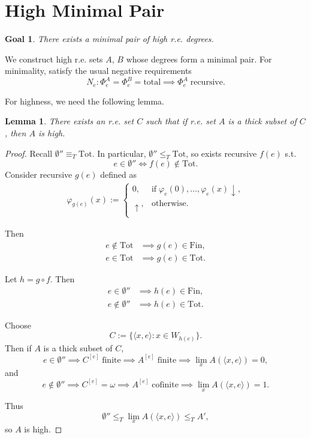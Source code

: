 \documentclass{article}
\newtheorem{lemma}{Lemma}[subsection]
\newtheorem{goal}{Goal}[subsection]
\begin{document}
\section{High Minimal Pair}
  \begin{goal}
    There exists a minimal pair of high r.e. degrees.
  \end{goal}

  We construct high r.e. sets $A$, $B$ whose degrees form a minimal pair.
  For minimality, satisfy the usual negative requirements
  \[N_e: \Phi_e^A=\Phi_e^B=\text{total} \implies \Phi_e^A\;
  \text{recursive}.\]

  For highness, we need the following lemma.
  \begin{lemma}
    There exists an r.e. set $C$ such that if r.e. set $A$ is a thick
    subset of $C$, then $A$ is high.
  \end{lemma}
  \begin{proof}
    Recall $\emptyset''\equiv_T\text{Tot}$. In
    particular, $\emptyset''\leq_T\text{Tot}$, so exists recursive $f(e)$
    s.t.
    \[e\in\emptyset'' \Leftrightarrow f(e)\not\in\text{Tot}.\]
    Consider recursive $g(e)$ defined as
    \begin{align*}
      \varphi_{g(e)}(x) :=
      \begin{cases}
        0, &\text{if}\; \varphi_e(0),\ldots,\varphi_e(x)\downarrow,\\
        \uparrow, &\text{otherwise}.\\
      \end{cases}
    \end{align*}

    Then
    \begin{align*}
      e\not\in\text{Tot} &\implies g(e)\in\text{Fin},\\
      e\in\text{Tot} &\implies g(e)\in\text{Tot}.
    \end{align*}

    Let $h=g\circ f$. Then
    \begin{align*}
      e\in\emptyset'' &\implies h(e)\in\text{Fin},\\
      e\not\in\emptyset'' &\implies h(e)\in\text{Tot}.
    \end{align*}

    Choose
    \[C :=\{\langle x,e\rangle: x\in W_{h(e)}\}.\]
    Then if $A$ is a thick subset of $C$,
    \[e\in\emptyset'' \implies C^{[e]}\; \text{finite} \implies A^{[e]}\;
    \text{finite} \implies \lim_x A(\langle x,e\rangle)=0,\]
    and
    \[e\not\in\emptyset'' \implies C^{[e]}=\omega \implies A^{[e]}\;
    \text{cofinite} \implies \lim_x A(\langle x,e\rangle)=1.\]

    Thus
    \[\emptyset''\leq_T \lim_x A(\langle x,e\rangle) \leq_T A',\]
    so $A$ is high.
  \end{proof}
\end{document}
